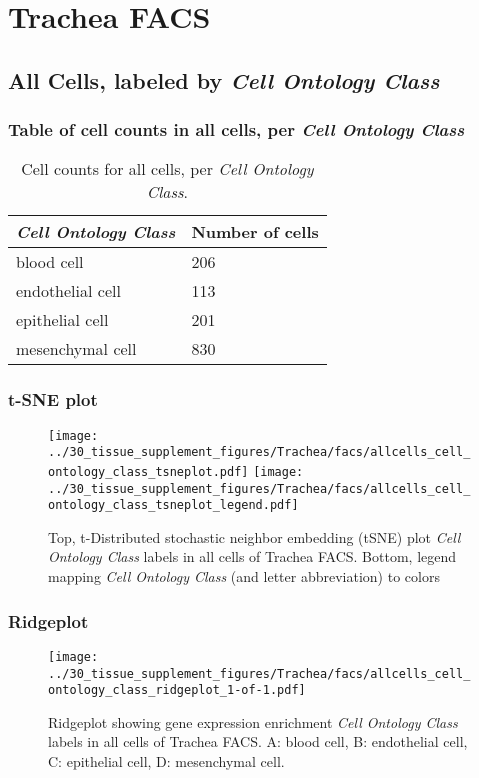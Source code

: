 \clearpage
\section{Trachea FACS}

\subsection{All Cells, labeled by \emph{Cell Ontology Class}}
\subsubsection{Table of cell counts in all cells, per \emph{Cell Ontology Class}}\begin{table}[h]
\centering
\label{my-label}
\begin{tabular}{@{}ll@{}}
\toprule

\emph{Cell Ontology Class}& Number of cells \\ \midrule
blood cell & 206 \\

endothelial cell & 113 \\

epithelial cell & 201 \\

mesenchymal cell & 830 \\
\bottomrule
\end{tabular}
\caption{Cell counts for all cells, per \emph{Cell Ontology Class}.}
\end{table}

\clearpage
\subsubsection{t-SNE plot}
\begin{figure}[h]
\centering
\texttt{[image: ../30\_tissue\_supplement\_figures/Trachea/facs/allcells\_cell\_ontology\_class\_tsneplot.pdf]}
\texttt{[image: ../30\_tissue\_supplement\_figures/Trachea/facs/allcells\_cell\_ontology\_class\_tsneplot\_legend.pdf]}
\caption{Top, t-Distributed stochastic neighbor embedding (tSNE) plot  \emph{Cell Ontology Class} labels in all cells of Trachea FACS. Bottom, legend mapping \emph{Cell Ontology Class} (and letter abbreviation) to colors}
\end{figure}


\clearpage

\subsubsection{Ridgeplot}
\begin{figure}[h]
\centering
\texttt{[image: ../30\_tissue\_supplement\_figures/Trachea/facs/allcells\_cell\_ontology\_class\_ridgeplot\_1-of-1.pdf]}

\caption{ Ridgeplot  showing gene expression enrichment \emph{Cell Ontology Class} labels in all cells of Trachea FACS. A: blood cell, B: endothelial cell, C: epithelial cell, D: mesenchymal cell.}
\end{figure}


